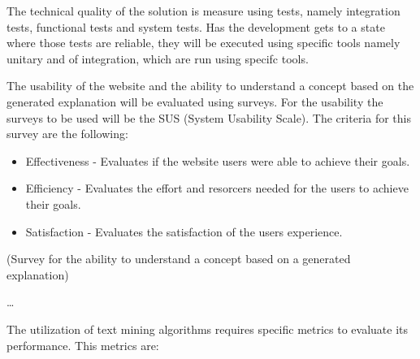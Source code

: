 The technical quality of the solution is measure using tests, namely integration tests, functional tests and system tests.
Has the development gets to a state where those tests are reliable, they will be executed using specific tools  namely unitary and of integration, which are run using specifc tools.

The usability of the website and the ability to understand a concept based on the generated explanation will be evaluated using surveys.
For the usability the surveys to be used will be the SUS (System Usability Scale).
The criteria for this survey are the following:

\begin{itemize}
    \item Effectiveness - Evaluates if the website users were able to achieve their goals.
    \item Efficiency - Evaluates the effort and resorcers needed for the users to achieve their goals.
    \item Satisfaction - Evaluates the satisfaction of the users experience.
\end{itemize}

(Survey for the ability to understand a concept based on a generated explanation)

\dots


The utilization of text mining algorithms requires specific metrics to evaluate its performance.
This metrics are: 


